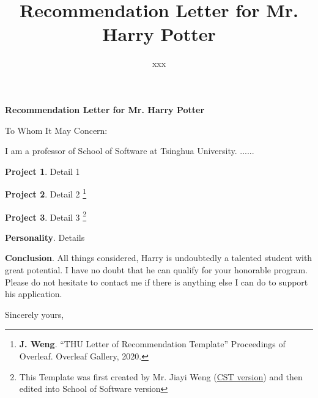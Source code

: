 \documentclass[a4paper]{letter}
\title{\bf Recommendation Letter for Mr. Harry Potter}
\author{xxx}
\begin{document}
\begin{letter}{\bf Recommendation Letter for Mr. Harry Potter}
\opening{To Whom It May Concern:}

I am a professor of School of Software at Tsinghua University.  ......

\textbf{Project 1}. Detail 1

\textbf{Project 2}. Detail 2 \footnote{\textbf{J. Weng}. ``THU Letter of Recommendation Template'' Proceedings of Overleaf. Overleaf Gallery, 2020.}

\textbf{Project 3}. Detail 3 \footnote{This Template was first created by Mr. Jiayi Weng (\href{https://www.overleaf.com/latex/templates/thu-letter-of-recommendation-template/ghjfgfhykprk}{CST version}) and then edited into School of Software version}

\textbf{Personality}. Details

\textbf{Conclusion}. All things considered, Harry is undoubtedly a talented student with great potential. I have no doubt that he can qualify for your honorable program. Please do not hesitate to contact me if there is anything else I can do to support his application.

\closing{Sincerely yours,\\
\fromsig{%
}
}

\end{letter}
\end{document}
